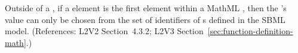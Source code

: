 Outside of a \FunctionDefinition, if a  element is the
first element within a MathML , then the 's
value can only be chosen from the set of identifiers of
\FunctionDefinition{}s defined in the SBML model.
(References: L2V2 Section~4.3.2; L2V3
Section~\ref{sec:function-definition-math}.)
